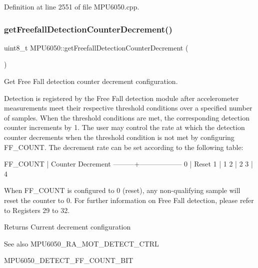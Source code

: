 Definition at line 2551 of file M\+P\+U6050.\+cpp.

\mbox{\label{classMPU6050_af6d6fa9869636989a8b29c4827ad7de8}} 
\subsubsection{\texorpdfstring{getFreefallDetectionCounterDecrement()}{getFreefallDetectionCounterDecrement()}}
{\footnotesize\ttfamily uint8\+\_\+t M\+P\+U6050\+::get\+Freefall\+Detection\+Counter\+Decrement (\begin{DoxyParamCaption}{ }\end{DoxyParamCaption})}



Get Free Fall detection counter decrement configuration. 

Detection is registered by the Free Fall detection module after accelerometer measurements meet their respective threshold conditions over a specified number of samples. When the threshold conditions are met, the corresponding detection counter increments by 1. The user may control the rate at which the detection counter decrements when the threshold condition is not met by configuring F\+F\+\_\+\+C\+O\+U\+NT. The decrement rate can be set according to the following table\+:


\begin{DoxyPre}
FF\_COUNT | Counter Decrement
---------+------------------
0        | Reset
1        | 1
2        | 2
3        | 4
\end{DoxyPre}


When F\+F\+\_\+\+C\+O\+U\+NT is configured to 0 (reset), any non-\/qualifying sample will reset the counter to 0. For further information on Free Fall detection, please refer to Registers 29 to 32.

\begin{DoxyReturn}{Returns}
Current decrement configuration 
\end{DoxyReturn}
\begin{DoxySeeAlso}{See also}
M\+P\+U6050\+\_\+\+R\+A\+\_\+\+M\+O\+T\+\_\+\+D\+E\+T\+E\+C\+T\+\_\+\+C\+T\+RL 

M\+P\+U6050\+\_\+\+D\+E\+T\+E\+C\+T\+\_\+\+F\+F\+\_\+\+C\+O\+U\+N\+T\+\_\+\+B\+IT 
\end{DoxySeeAlso}


